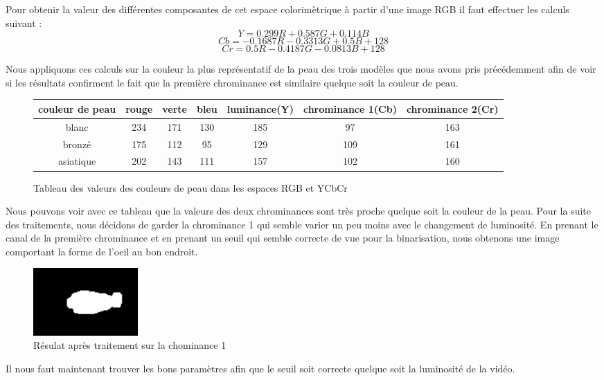 Pour obtenir la valeur des différentes composantes de cet espace colorimètrique à partir
d'une image RGB il faut effectuer les calculs suivant :
$$Y = 0.299R + 0.587 G + 0.114 B$$
$$Cb = -0.1687R - 0.3313 G + 0.5B + 128$$
$$Cr = 0.5R -0.4187G -0.0813B + 128$$

Nous appliquons ces calculs sur la couleur la plus représentatif de la peau des trois modèles
que nous avons pris précédemment afin de voir si les résultats confirment le fait que la première
chrominance est similaire quelque soit la couleur de peau.

\begin{figure}[H]
 \begin{tabular}{|c|c|c|c|c|c|c|}
  \hline
  couleur de peau & rouge & verte & bleu & luminance(Y) & chrominance 1(Cb) & chrominance 2(Cr)\\
  \hline
  blanc & 234 & 171 & 130 & 185 & 97 & 163 \\
  \hline
  bronzé & 175 & 112 & 95 & 129 & 109 & 161 \\
  \hline
  asiatique & 202 & 143 & 111 & 157 & 102 & 160\\
  \hline
 \end{tabular}
 \caption{Tableau des valeurs des couleurs de peau dans les espaces RGB et YCbCr}
\end{figure}

Nous pouvons voir avec ce tableau que la valeurs des deux chrominances sont très proche quelque soit
la couleur de la peau. Pour la suite des traitements, nous décidons de garder la chrominance 1 qui semble
varier un peu moins avec le changement de luminosité. En prenant le canal de la première chrominance et en 
prenant un seuil qui semble correcte de vue pour la binarisation, nous obtenons une image comportant la forme de l'oeil au bon endroit.

\begin{figure}[H]
 \center
 \includegraphics[width=4cm]{image/result_yuv.png}
 \caption{Résulat après traitement sur la chominance 1}
\end{figure}

Il nous faut maintenant trouver les bons paramètres afin que le seuil soit correcte quelque
soit la luminosité de la vidéo.

